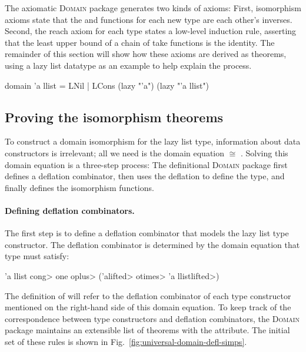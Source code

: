 The axiomatic \textsc{Domain} package generates two kinds of axioms: First, isomorphism axioms state that the  and  functions for each new type are each other's inverses. Second, the reach axiom for each type states a low-level induction rule, asserting that the least upper bound of a chain of take functions is the identity. The remainder of this section will show how these axioms are derived as theorems, using a lazy list datatype as an example to help explain the process.
%
\begin{isacode}
domain 'a llist = LNil | LCons (lazy "'a") (lazy "'a llist")
\end{isacode}

\subsection{Proving the isomorphism theorems}
\label{sec:universal-package-iso}

To construct a domain isomorphism for the lazy list type, information about data constructors is irrelevant; all we need is the domain equation  $\cong$  . Solving this domain equation is a three-step process: The definitional \textsc{Domain} package first defines a deflation combinator, then uses the deflation to define the  type, and finally defines the isomorphism functions.

\paragraph{Defining deflation combinators.}
%
The first step is to define a deflation combinator  that models the lazy list type constructor. The deflation combinator is determined by the domain equation that type  must satisfy:
%
\begin{isacode}
'a llist \<cong> one \<oplus> ('a\<lifted> \<otimes> 'a llist\<lifted>)
\end{isacode}

The definition of  will refer to the deflation combinator of each type constructor mentioned on the right-hand side of this domain equation. To keep track of the correspondence between type constructors and deflation combinators, the \textsc{Domain} package maintains an extensible list of theorems with the  attribute. The initial set of these rules is shown in Fig.~\ref{fig:universal-domain-defl-simps}.

